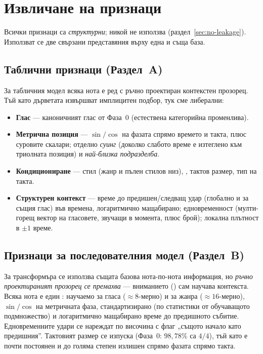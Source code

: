 \section{Извличане на признаци}
\label{sec:feature-extraction}

Всички признаци са \emph{структурни}; никой не използва 
(раздел~\ref{sec:no-leakage}). Използват се две свързани представяния върху една
и съща база.

\subsection{Таблични признаци (Раздел~A)}
\label{sec:features-a}

За табличния модел всяка нота е ред с ръчно проектиран контекстен прозорец. Тъй
като дърветата извършват имплицитен подбор, тук сме либерални:
\begin{itemize}
  \item \textbf{Глас} — каноничният глас от Фаза~0 (естествена категорийна
        променлива).
  \item \textbf{Метрична позиция} — $\sin/\cos$ на фазата спрямо времето и такта,
        плюс суровите скалари; отделно \emph{суинг} (доколко слабото време е изтеглено
        към триолната позиция) и \emph{най-близка подразделба}.
  \item \textbf{Кондициониране} — стил (жанр и пълен стилов низ), ,
        тактов размер, тип на такта.
  \item \textbf{Структурен контекст} — време до предишен/следващ удар (глобално и
        за същия глас) във времена, логаритмично мащабирано; едновременност (мулти-горещ
        вектор на гласовете, звучащи в момента, плюс брой); локална плътност в
        $\pm1$ време.
\end{itemize}

\subsection{Признаци за последователния модел (Раздел~B)}
\label{sec:features-b}

За трансформъра се използва същата базова нота-по-нота информация, но
\emph{ръчно проектираният прозорец се премахва} — вниманието ()
сам научава контекста. Всяка нота е един : научаемо  за
гласа ($\approx8$-мерно) и за жанра ($\approx16$-мерно), $\sin/\cos$ на метричната
фаза, стандартизирано (по статистики от обучаващото подмножество)  и
логаритмично мащабирано време до предишното събитие. Едновременните удари се
нареждат по височина с флаг „същото начало като предишния''. Тактовият размер се
изпуска (Фаза~0: $98{,}78\%$ са $4/4$), тъй като е почти постоянен и до голяма
степен излишен спрямо фазата спрямо такта.

